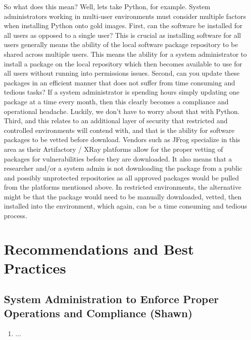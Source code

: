 \documentclass{amia}
\begin{document}
\begin{enumerate}
So what does this mean?  Well, lets take Python, for example.  System administrators working in multi-user environments must consider multiple factors when installing Python onto gold images.  First, can the software be installed for all users as opposed to a single user?  This is crucial as installing software for all users generally means the ability of the local software package repository to be shared across multiple users.  This means the ability for a system administrator to install a package on the local repository which then becomes available to use for all users without running into permissions issues.  Second, can you update these packages in an efficient manner that does not suffer from time consuming and tedious tasks?  If a system administrator is spending hours simply updating one package at a time every month, then this clearly becomes a compliance and operational headache.  Luckily, we don't have to worry about that with Python.  Third, and this relates to an additional layer of security that restricted and controlled environments will contend with, and that is the ability for software packages to be vetted before download.  Vendors such as JFrog specialize in this area as their Artifactory / XRay platforms allow for the proper vetting of packages for vulnerabilities before they are downloaded.  It also means that a researcher and/or a system admin is not downloading the package from a public and possibly unprotected repositories as all approved packages would be pulled from the platforms mentioned above.  In restricted environments, the alternative might be that the package would need to be manually downloaded, vetted, then installed into the environment, which again, can be a time consuming and tedious process. 

        \end{enumerate}


\section*{Recommendations and Best Practices}

\subsection{System Administration to Enforce Proper Operations and Compliance (Shawn)}

        \begin{enumerate}
            \item ...
        \end{enumerate}
\end{document}
